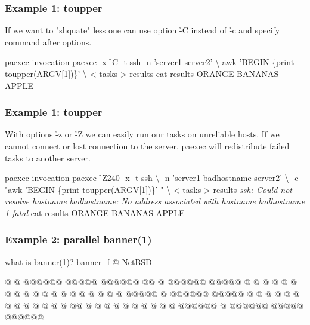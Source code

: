 \documentclass[hyperref={colorlinks=true}]{beamer}
\begin{document}
\begin{frame}[fragile]
  \frametitle{Example 1: toupper}
If we want to "shquate" less one can use option \h{-C} instead of \h{-c}
and specify command after options.
  \begin{block}{}
      \begin{CodeLarge}{paexec invocation}
\prompt{\$} paexec -x \h{-C} -t ssh -n 'server1 server2' \textbackslash
awk 'BEGIN \{print toupper(ARGV[1])\}' \textbackslash
    < tasks > results
\prompt{\$} cat results
ORANGE
BANANAS
APPLE
\prompt{\$}
      \end{CodeLarge}
  \end{block}
\end{frame}


\begin{frame}[fragile]
  \frametitle{Example 1: toupper}
With options \h{-z} or \h{-Z} we can easily run our tasks on
unreliable hosts. If we cannot connect or lost connection to the
server, paexec will redistribute failed tasks to another server.
  \begin{block}{}
      \begin{CodeLarge}{paexec invocation}
\prompt{\$} paexec \h{-Z}240 -x -t ssh \textbackslash
-n 'server1 badhostname server2' \textbackslash
-c "awk 'BEGIN \{print toupper(ARGV[1])\}' " \textbackslash
    < tasks > results
{\it ssh: Could not resolve hostname badhostname:}
{\it  No address associated with hostname}
{\it  badhostname 1 fatal}
\prompt{\$} cat results
ORANGE
BANANAS
APPLE
\prompt{\$}
      \end{CodeLarge}
  \end{block}
\end{frame}


\linespread{0.5}
\begin{frame}[fragile]
  \frametitle{Example 2: parallel banner(1)}

  \begin{block}{}
      \begin{CodeLarge}{what is banner(1)?}
\prompt{\$} banner -f @ NetBSD

@     @                 @@@@@@   @@@@@  @@@@@@
@@    @  @@@@@@   @@@@@ @     @ @     @ @     @
@ @   @  @          @   @     @ @       @     @
@  @  @  @@@@@      @   @@@@@@   @@@@@  @     @
@   @ @  @          @   @     @       @ @     @
@    @@  @          @   @     @ @     @ @     @
@     @  @@@@@@     @   @@@@@@   @@@@@  @@@@@@


\prompt{\$}
      \end{CodeLarge}
  \end{block}
\end{frame}
\linespread{1}
\end{document}
